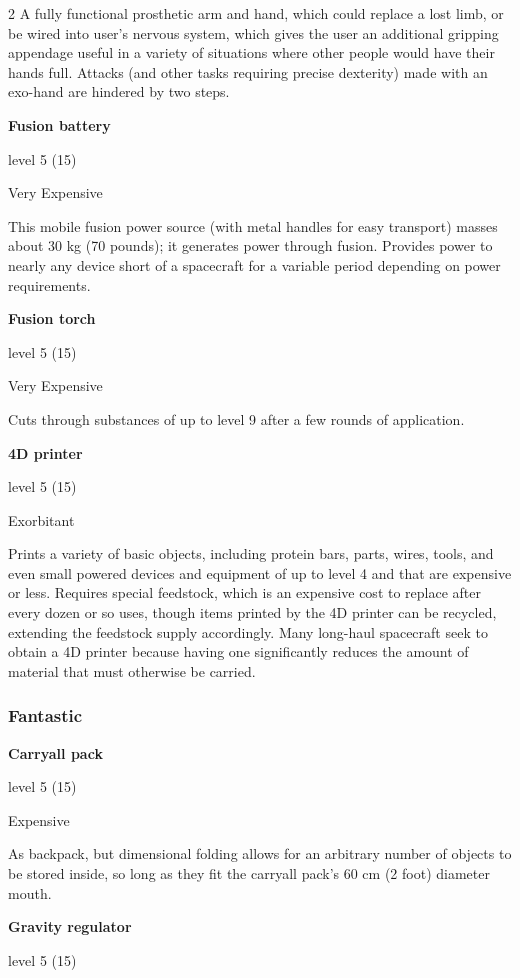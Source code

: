 \begin{multicols}{2}
A fully functional prosthetic arm and hand, which could replace a lost limb, or be wired into user’s nervous system, which gives the user an additional gripping appendage useful in a variety of situations where other people would have their hands full. Attacks (and other tasks requiring precise dexterity) made with an exo-hand are hindered by two steps. 

\textbf{Fusion battery} 

level 5 (15)

Very Expensive 

This mobile fusion power source (with metal handles for easy transport) masses about 30 kg (70 pounds); it generates power through fusion. Provides power to nearly any device short of a spacecraft for a variable period depending on power requirements.

\textbf{Fusion torch} 

level 5 (15) 

Very Expensive 

Cuts through substances of up to level 9 after a few rounds of application. 

\textbf{4D printer} 

level 5 (15) 

Exorbitant 

Prints a variety of basic objects, including protein bars, parts, wires, tools, and even small powered devices and equipment of up to level 4 and that are expensive or less. Requires special feedstock, which is an expensive cost to replace after every dozen or so uses, though items printed by the 4D printer can be recycled, extending the feedstock supply accordingly. Many long-haul spacecraft seek to obtain a 4D printer because having one significantly reduces the amount of material that must otherwise be carried.

\subsubsection{Fantastic}

\textbf{Carryall pack} 

level 5 (15) 

Expensive 

As backpack, but dimensional folding allows for an arbitrary number of objects to be stored inside, so long as they fit the carryall pack’s 60 cm (2 foot) diameter mouth. 

\textbf{Gravity regulator} 

level 5 (15) 


\end{multicols}
